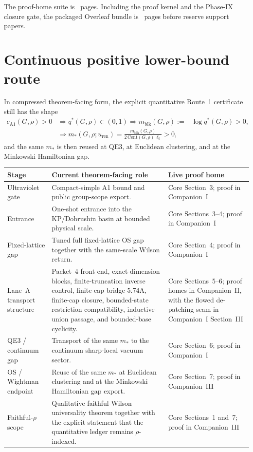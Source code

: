 \documentclass[11pt]{article}
\begin{document}
The proof-home suite is \ProofHomeTotal\ pages. Including the proof kernel and the Phase-IX closure gate, the packaged Overleaf bundle is \FullBundleTotal\ pages before reserve support papers.

\section{Continuous positive lower-bound route}

In compressed theorem-facing form, the explicit quantitative Route~1 certificate still has the shape
\[
\begin{aligned}
  c_{\mathrm{A1}}(G,\rho)>0
    &\Longrightarrow q^{\ast}(G,\rho)\in(0,1)
     \Longrightarrow m_{\mathrm{blk}}(G,\rho):=-\log q^{\ast}(G,\rho)>0,\\
    &\Longrightarrow m_{\ast}(G,\rho;u_{\mathrm{ren}})
      =\frac{m_{\mathrm{blk}}(G,\rho)}{2\,\mathrm{Cent}(G,\rho)\,\ell_0}>0,
\end{aligned}
\]
and the same $m_{\ast}$ is then reused at QE3, at Euclidean clustering, and at the Minkowski Hamiltonian gap.

\begin{center}
\small
\begin{tabularx}{\linewidth}{@{}L{2.2cm}Y Y@{}}
\toprule
\textbf{Stage} & \textbf{Current theorem-facing role} & \textbf{Live proof home}\\
\midrule
Ultraviolet gate & Compact-simple A1 bound and public group-scope export. & Core Section~3; proof in Companion~I\\
Entrance & One-shot entrance into the KP/Dobrushin basin at bounded physical scale. & Core Sections~3--4; proof in Companion~I\\
Fixed-lattice gap & Tuned full fixed-lattice OS gap together with the same-scale Wilson return. & Core Section~4; proof in Companion~I\\
Lane~A transport structure & Packet~4 front end, exact-dimension blocks, finite-truncation inverse control, finite-cap bridge 5.74A, finite-cap closure, bounded-state restriction compatibility, inductive-union passage, and bounded-base cyclicity. & Core Sections~5--6; proof homes in Companion~II, with the flowed de-patching seam in Companion~I Section~III\\
QE3 / continuum gap & Transport of the same $m_{\ast}$ to the continuum sharp-local vacuum sector. & Core Section~6; proof in Companion~I\\
OS / Wightman endpoint & Reuse of the same $m_{\ast}$ at Euclidean clustering and at the Minkowski Hamiltonian gap export. & Core Section~7; proof in Companion~III\\
Faithful-$\rho$ scope & Qualitative faithful-Wilson universality theorem together with the explicit statement that the quantitative ledger remains $\rho$-indexed. & Core Sections~1 and~7; proof in Companion~III\\
\bottomrule
\end{tabularx}
\end{center}
\end{document}
